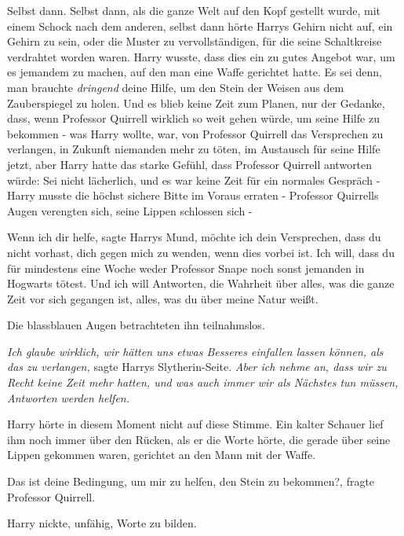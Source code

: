 Selbst dann. Selbst dann, als die ganze Welt auf den Kopf gestellt wurde, mit
einem Schock nach dem anderen, selbst dann hörte Harrys Gehirn nicht auf, ein
Gehirn zu sein, oder die Muster zu vervollständigen, für die seine Schaltkreise
verdrahtet worden waren. Harry wusste, dass dies ein zu gutes Angebot war, um es
jemandem zu machen, auf den man eine Waffe gerichtet hatte. Es sei denn, man
brauchte \emph{dringend} deine Hilfe, um den Stein der Weisen aus dem
Zauberspiegel zu holen. Und es blieb keine Zeit zum Planen, nur der Gedanke,
dass, wenn Professor Quirrell wirklich so weit gehen würde, um seine Hilfe zu
bekommen - was Harry wollte, war, von Professor Quirrell das Versprechen zu
verlangen, in Zukunft niemanden mehr zu töten, im Austausch für seine Hilfe
jetzt, aber Harry hatte das starke Gefühl, dass Professor Quirrell antworten
würde: \glqq{}Sei nicht lächerlich\grqq{}, und es war keine Zeit für ein normales
Gespräch - Harry musste die höchst sichere Bitte im Voraus erraten - Professor
Quirrells Augen verengten sich, seine Lippen schlossen sich -

\glqq{}Wenn ich dir helfe\grqq{}, sagte Harrys Mund, \glqq{}möchte ich dein
Versprechen, dass du nicht vorhast, dich gegen mich zu wenden, wenn dies vorbei
ist. Ich will, dass du für mindestens eine Woche weder Professor Snape noch
sonst jemanden in Hogwarts tötest. Und ich will Antworten, die Wahrheit über
alles, was die ganze Zeit vor sich gegangen ist, alles, was du über meine Natur
weißt.\grqq{}

Die blassblauen Augen betrachteten ihn teilnahmslos.

\emph{Ich glaube wirklich, wir hätten uns etwas Besseres einfallen lassen
können, als das zu verlangen,} sagte Harrys Slytherin-Seite. \emph{Aber ich
nehme an, dass wir zu Recht keine Zeit mehr hatten, und was auch immer wir als
Nächstes tun müssen, Antworten werden helfen.}

Harry hörte in diesem Moment nicht auf diese Stimme. Ein kalter Schauer lief ihm
noch immer über den Rücken, als er die Worte hörte, die gerade über seine Lippen
gekommen waren, gerichtet an den Mann mit der Waffe.

\glqq{}Das ist deine Bedingung, um mir zu helfen, den Stein zu bekommen?\grqq{},
fragte Professor Quirrell.

Harry nickte, unfähig, Worte zu bilden.

